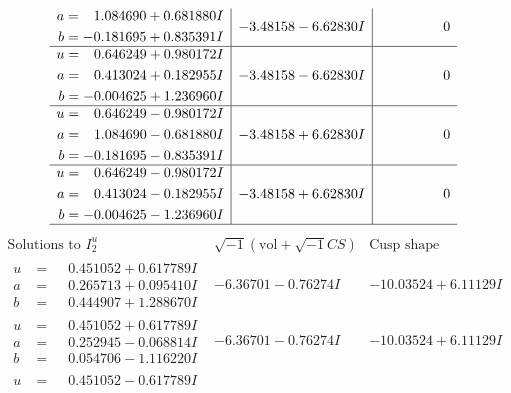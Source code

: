\documentclass[1p]{elsarticle_modified}
\theoremstyle{definition}
\newcommand{\I}{\sqrt{-1}}
\begin{document}
$$\begin{array}{c|c|c}
\begin{aligned}
a &= \phantom{-}1.084690 + 0.681880 I \\
b &= -0.181695 + 0.835391 I\end{aligned}
 & -3.48158 - 6.62830 I & \phantom{-0.000000 } 0 \\ \hline\begin{aligned}
u &= \phantom{-}0.646249 + 0.980172 I \\
a &= \phantom{-}0.413024 + 0.182955 I \\
b &= -0.004625 + 1.236960 I\end{aligned}
 & -3.48158 - 6.62830 I & \phantom{-0.000000 } 0 \\ \hline\begin{aligned}
u &= \phantom{-}0.646249 - 0.980172 I \\
a &= \phantom{-}1.084690 - 0.681880 I \\
b &= -0.181695 - 0.835391 I\end{aligned}
 & -3.48158 + 6.62830 I & \phantom{-0.000000 } 0 \\ \hline\begin{aligned}
u &= \phantom{-}0.646249 - 0.980172 I \\
a &= \phantom{-}0.413024 - 0.182955 I \\
b &= -0.004625 - 1.236960 I\end{aligned}
 & -3.48158 + 6.62830 I & \phantom{-0.000000 } 0\\
 \hline 
 \end{array}$$\newpage$$\begin{array}{c|c|c}  
\text{Solutions to }I^u_{2}& \I (\text{vol} + \sqrt{-1}CS) & \text{Cusp shape}\\
 \hline 
\begin{aligned}
u &= \phantom{-}0.451052 + 0.617789 I \\
a &= \phantom{-}0.265713 + 0.095410 I \\
b &= \phantom{-}0.444907 + 1.288670 I\end{aligned}
 & -6.36701 - 0.76274 I & -10.03524 + 6.11129 I \\ \hline\begin{aligned}
u &= \phantom{-}0.451052 + 0.617789 I \\
a &= \phantom{-}0.252945 - 0.068814 I \\
b &= \phantom{-}0.054706 - 1.116220 I\end{aligned}
 & -6.36701 - 0.76274 I & -10.03524 + 6.11129 I \\ \hline\begin{aligned}
u &= \phantom{-}0.451052 - 0.617789 I \\

\end{aligned}
\end{array}$$
\end{document}
